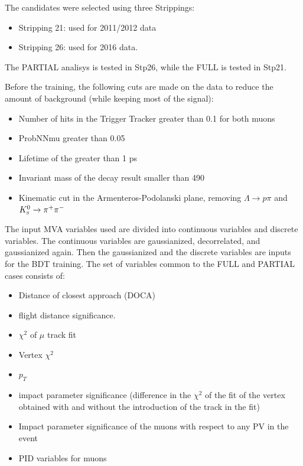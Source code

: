 The candidates were selected using three Strippings: 
\begin{itemize}
\item Stripping 21: used for 2011/2012 data
\item Stripping 26: used for 2016 data.
\end{itemize}

The PARTIAL analisys is tested in Stp26, while the FULL is tested in Stp21.

Before the training, the following cuts are made on the data to reduce the amount of background (while keeping most of the signal):
\begin{itemize}
\item Number of hits in the Trigger Tracker greater than 0.1 for both muons
\item ProbNNmu greater than 0.05 
\item Lifetime of the \KS greater than 1 ps
\item Invariant mass of the decay result smaller than 490 \mev
\item Kinematic cut in the Armenteros-Podolanski plane, removing $\Lambda\to p \pi$ and $K^0_{\mathrm{\scriptscriptstyle S}}\to \pi^{+}\pi^{-}$ 
\end{itemize}
The input MVA variables used are divided into continuous variables and discrete variables. The continuous variables are gaussianized, decorrelated, and gaussianized again. Then the gaussianized and the discrete 
variables are inputs for the BDT training. 
The set of variables common to the FULL and PARTIAL cases consists of:
\begin{itemize}
\item Distance of closest approach (DOCA)
\item \KS flight distance significance. 
\item $\chi^2$ of $\mu$ track fit
\item Vertex $\chi^2$
\item \KS $p_T$ 
\item \KS impact parameter significance (difference in the $\chi^2$ of the fit of the vertex obtained with and without the introduction of the track in the fit)
\item Impact parameter significance of the muons with respect to any PV in the event
\item PID variables for muons
\end{itemize}


